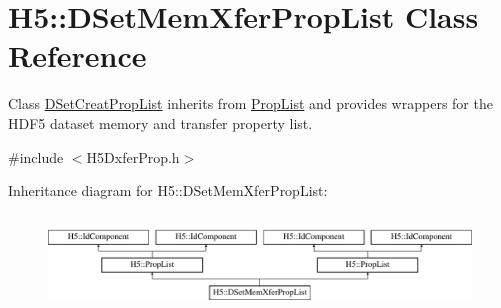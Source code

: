 \hypertarget{class_h5_1_1_d_set_mem_xfer_prop_list}{}\section{H5\+:\+:D\+Set\+Mem\+Xfer\+Prop\+List Class Reference}
\label{class_h5_1_1_d_set_mem_xfer_prop_list}


Class \hyperlink{class_h5_1_1_d_set_creat_prop_list}{D\+Set\+Creat\+Prop\+List} inherits from \hyperlink{class_h5_1_1_prop_list}{Prop\+List} and provides wrappers for the H\+D\+F5 dataset memory and transfer property list.  




{\ttfamily \#include $<$H5\+Dxfer\+Prop.\+h$>$}

Inheritance diagram for H5\+:\+:D\+Set\+Mem\+Xfer\+Prop\+List\+:\begin{figure}[H]
\begin{center}
\leavevmode
\includegraphics[height=2.514970cm]{class_h5_1_1_d_set_mem_xfer_prop_list}
\end{center}
\end{figure}
